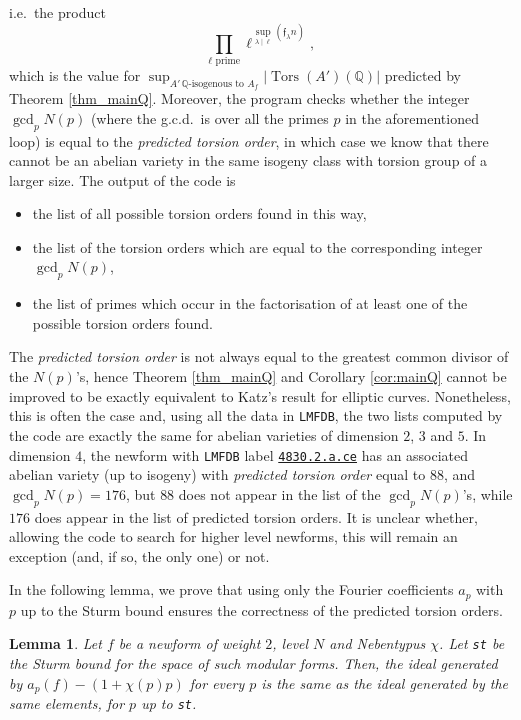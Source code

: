 \documentclass[a4paper,11pt]{amsart}
\newtheorem{lemma}[theorem]{Lemma}
\theoremstyle{definition}
\newcommand{\Q}{\mathbb Q}
\newcommand{\F}{\mathbb F}
\newcommand{\f}{\mathfrak{f}}
\DeclareMathOperator{\Tors}{Tors}
\begin{document}
i.e.\ the product
\[
\prod_{\ell \text{ prime}} \ell^{\sup_{\lambda \mid \ell} (\f_\lambda n)},
\]
which is the value for \(\displaystyle\sup_{A'\, \Q\text{-isogenous to }A_f} |\Tors(A')(\Q)|\) predicted by Theorem \ref{thm_mainQ}. Moreover, the program checks whether the integer \(\gcd_p N(p)\) (where the g.c.d.\ is over all the primes \(p\) in the aforementioned loop) is equal to the \emph{predicted torsion order}, in which case we know that there cannot be an abelian variety in the same isogeny class with torsion group of a larger size. %
The output of the code is 
\begin{itemize}
    \item the list of all possible torsion orders found in this way, 
    \item the list of the torsion orders which are equal to the corresponding integer \(\gcd_p N(p)\),
    \item the list of primes which occur in the factorisation of at least one of the possible torsion orders found. 
\end{itemize}
The \emph{predicted torsion order} is not always equal to the greatest common divisor of the \(N(p)\)'s, hence Theorem \ref{thm_mainQ} and Corollary \ref{cor:mainQ} cannot be improved to be exactly equivalent to Katz's result for elliptic curves. Nonetheless, this is often the case and, using all the data in \texttt{LMFDB}, the two lists computed by the code are exactly the same for abelian varieties of dimension \(2\), \(3\) and \(5\).
In dimension \(4\), the newform with \texttt{LMFDB} label \texttt{\href{https://www.lmfdb.org/ModularForm/GL2/Q/holomorphic/4830/2/a/ce/}{4830.2.a.ce}} has an associated abelian variety (up to isogeny) with \emph{predicted torsion order} equal to \(88\), and \(\gcd_p N(p) = 176\), but \(88\) does not appear in the list of the \(\gcd_p N(p)\)'s, while \(176\) does appear in the list of predicted torsion orders. It is unclear whether, allowing the code to search for higher level newforms, this will remain an exception (and, if so, the only one) or not.

In the following lemma, we prove that using only the Fourier coefficients \(a_p\) with \(p\) up to the Sturm bound ensures the correctness of the predicted torsion orders.

\begin{lemma}\label{lem:sturm}
    Let \(f\) be a newform of weight \(2\), level \(N\) and Nebentypus \(\chi\). Let \texttt{st} be the Sturm bound for the space of such modular forms. Then, the ideal generated by \(a_p(f) - (1 + \chi(p)p)\) for every \(p\) is the same as the ideal generated by the same elements, for \(p\) up to \texttt{st}.
\end{lemma}
\end{document}
